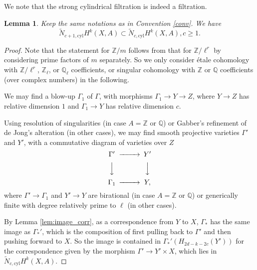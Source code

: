 \documentclass{amsart}
\newtheorem{lem}[theorem]{Lemma}
\theoremstyle{definition}
\theoremstyle{remark}
\newcommand{\mbb}{\mathbb}
\newcommand{\QQ}{\mbb{Q}}
\newcommand{\ZZ}{\mbb{Z}}
\newcommand{\cyl}{\text{cyl}}
\begin{document}
We note that the strong cylindrical filtration is indeed a filtration.
\begin{lem}\label{lem:contain}
    Keep the same notations as in Convention \ref{conv}.
    We have $$\tilde{N}_{c+1, \cyl}H^k(X, A) \subset \tilde{N}_{c, \cyl}H^k(X, A), c\geq 1.$$
\end{lem}
\begin{proof}
    Note that the statement for $\ZZ/m$ follows from that for $\ZZ/\ell^r$ by considering prime factors of $m$ separately. So we only consider \'etale cohomology with $\ZZ/\ell^r$, $\ZZ_\ell$, or $\QQ_\ell$ coefficients, or singular cohomology with $\ZZ$ or $\QQ$ coefficients (over complex numbers) in the following.
    
     We may find a blow-up $\Gamma_1$ of $\Gamma$, with morphisms $\Gamma_1 \to Y \to Z$, where $Y \to Z$ has relative dimension $1$ and $\Gamma_1 \to Y$ has relative dimension $c$. 
    
    Using resolution of singularities (in case $A=\ZZ$ or $\QQ$) or Gabber's refinement of de Jong's alteration (in other cases), we may find smooth projective varieties $\Gamma'$ and $Y'$, with a commutative diagram of varieties over $Z$
    \[
    \begin{CD}
        \Gamma' @>>>Y'\\
        @VVV @VVV\\
        \Gamma_1 @>>>Y,
    \end{CD}
    \]
    where $\Gamma' \to \Gamma_1$ and $Y'\to Y$ are birational (in case $A=\ZZ$ or $\QQ$) or generically finite with degree relatively prime to $\ell$ (in other cases).

    By Lemma \ref{lem:image_corr}, as a correspondence from $Y$ to $X$, $\Gamma_*$ has the same image as $\Gamma_*'$, which is the composition of first pulling back to $\Gamma'$ and then pushing forward to $X$.
    So the image is contained in $\Gamma_*'(H_{2d-k-2c}(Y'))$ for the correspondence given by the morphism $\Gamma'\to Y' \times X$, which lies in $\tilde{N}_{c, \cyl}H^k(X, A)$.
\end{proof}
\end{document}

